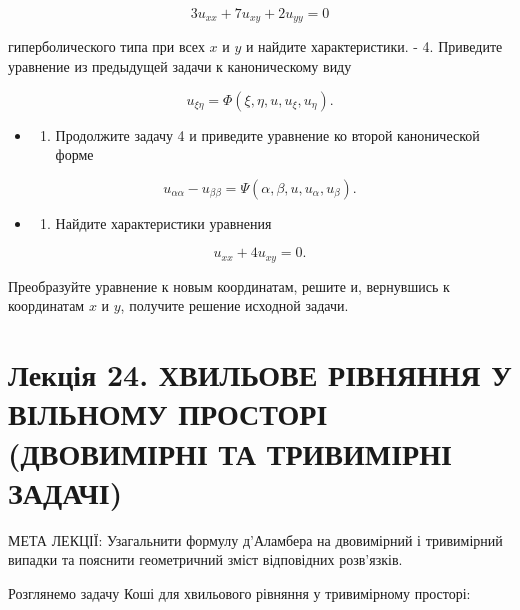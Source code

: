 \documentclass[
  ukrainian,
]{article}
\providecommand{\tightlist}{%
  \setlength{\itemsep}{0pt}\setlength{\parskip}{0pt}}
\begin{document}
\[
3u_{xx} + 7u_{xy} + 2u_{yy} = 0
\]

гиперболического типа при всех \(x\) и \(y\) и найдите характеристики. -
4. Приведите уравнение из предыдущей задачи к каноническому виду

\[
u_{\xi\eta} = \Phi(\xi, \eta, u, u_{\xi}, u_{\eta}).
\]

\begin{itemize}
\tightlist
\item
  \begin{enumerate}
  \def\labelenumi{\arabic{enumi}.}
  \setcounter{enumi}{4}
  \tightlist
  \item
    Продолжите задачу 4 и приведите уравнение ко второй канонической
    форме
  \end{enumerate}
\end{itemize}

\[
u_{\alpha\alpha} - u_{\beta\beta} = \Psi(\alpha, \beta, u, u_{\alpha}, u_{\beta}).
\]

\begin{itemize}
\tightlist
\item
  \begin{enumerate}
  \def\labelenumi{\arabic{enumi}.}
  \setcounter{enumi}{5}
  \tightlist
  \item
    Найдите характеристики уравнения
  \end{enumerate}
\end{itemize}

\[
u_{xx} + 4u_{xy} = 0.
\]

Преобразуйте уравнение к новым координатам, решите и, вернувшись к
координатам \(x\) и \(y\), получите решение исходной задачи.

\section{Лекція 24. ХВИЛЬОВЕ РІВНЯННЯ У ВІЛЬНОМУ ПРОСТОРІ (ДВОВИМІРНІ ТА
ТРИВИМІРНІ
ЗАДАЧІ)}\label{ux43bux435ux43aux446ux456ux44f-24.-ux445ux432ux438ux43bux44cux43eux432ux435-ux440ux456ux432ux43dux44fux43dux43dux44f-ux443-ux432ux456ux43bux44cux43dux43eux43cux443-ux43fux440ux43eux441ux442ux43eux440ux456-ux434ux432ux43eux432ux438ux43cux456ux440ux43dux456-ux442ux430-ux442ux440ux438ux432ux438ux43cux456ux440ux43dux456-ux437ux430ux434ux430ux447ux456}

МЕТА ЛЕКЦІЇ: Узагальнити формулу д'Аламбера на двовимірний і тривимірний
випадки та пояснити геометричний зміст відповідних розв'язків.

Розглянемо задачу Коші для хвильового рівняння у тривимірному просторі:
\end{document}
